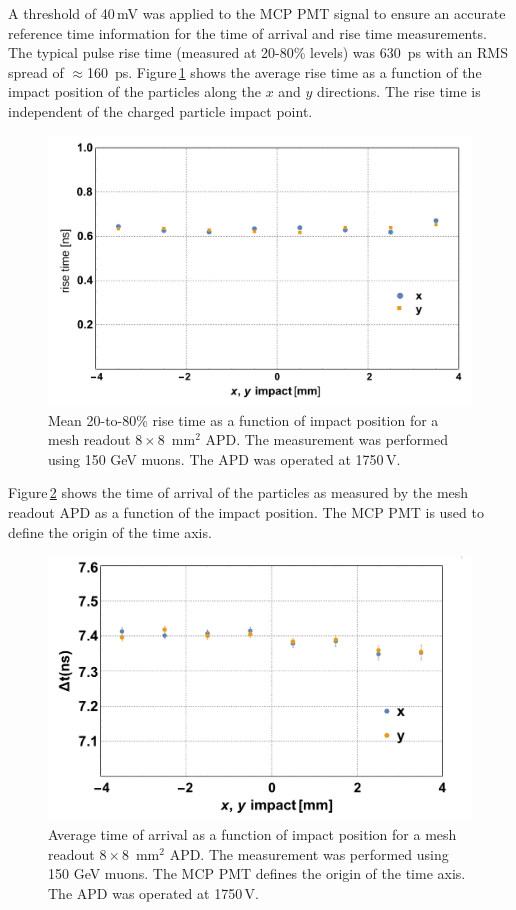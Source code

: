 \documentclass[3p,preprint,twocolumn]{elsarticle}
\begin{document}
A threshold of 40\,mV was applied to the MCP PMT signal to ensure an accurate reference time information for the time of arrival and rise time measurements.
The typical pulse rise time (measured at 20-80\% levels) was 630~ps with an RMS spread of $\approx$160~ps.
Figure\,\ref{fig:risetime8x8impact} shows the average rise time as a function of the impact position of the particles along the $x$ and $y$ directions.
The rise time is independent of the charged particle impact point.
\begin{figure}
  \centering
  \includegraphics[width = \columnwidth]{risetime8x8vsImpact}
  \caption{Mean 20-to-80\% rise time as a function of impact position for a mesh readout $8 \times 8$~mm$^2$ APD. The measurement was performed using 150 GeV muons. The APD was operated at 1750\,V.}
  \label{fig:risetime8x8impact}
\end{figure}

Figure\,\ref{fig:toa8x8impact} shows the time of arrival of the particles as measured by the mesh readout APD as a function of the impact position.
The MCP PMT is used to define the origin of the time axis.
\begin{figure}
  \centering
  \includegraphics[width = \columnwidth]{toa8x8VsImpact}
  \caption{Average time of arrival as a function of impact position for a mesh readout $8 \times 8$~mm$^2$ APD. The measurement was performed using 150 GeV muons. The MCP PMT defines the origin of the time axis. The APD was operated at 1750\,V.}
  \label{fig:toa8x8impact}
\end{figure}
\end{document}

